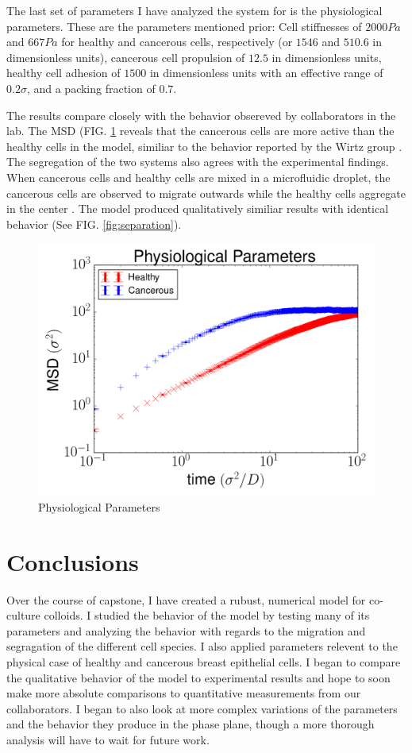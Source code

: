 \documentclass[aps,prb,twocolumn,groupedaddress,nofootinbib,floatfix]{revtex4}
\begin{document}
The last set of parameters I have analyzed the system for is the physiological parameters.
These are the parameters mentioned prior: Cell stiffnesses of $2000Pa$ and $667Pa$ for healthy and cancerous cells, respectively (or $1546$ and $510.6$ in dimensionless units), cancerous cell propulsion of $12.5$ in dimensionless units, healthy cell adhesion of $1500$ in dimensionless units with an effective range of $0.2\sigma$, and a packing fraction of $0.7$.

The results compare closely with the behavior obsereved by collaborators in the lab.
The MSD (FIG. \ref{fig:phys} reveals that the cancerous cells are more active than the healthy cells in the model, similiar to the behavior reported by the Wirtz group \cite{Lee}.
The segregation of the two systems also agrees with the experimental findings.
When cancerous cells and healthy cells are mixed in a microfluidic droplet, the cancerous cells are observed to migrate outwards while the healthy cells aggregate in the center \cite{Lu}.
The model produced qualitatively similiar results with identical behavior (See FIG. \ref{fig:separation}).


\begin{figure}
  \includegraphics[width=0.9\columnwidth]{images/physmsd.png}
  \caption{Physiological Parameters}
   \label{fig:phys}
\end{figure}


\section{Conclusions}
Over the course of capstone, I have created a rubust, numerical model for co-culture colloids.
I studied the behavior of the model by testing many of its parameters and analyzing the behavior with regards to the migration and segragation of the different cell species.
I also applied parameters relevent to the physical case of healthy and cancerous breast epithelial cells.
I began to compare the qualitative behavior of the model to experimental results and hope to soon make more absolute comparisons to quantitative measurements from our collaborators.
I began to also look at more complex variations of the parameters and the behavior they produce in the phase plane, though a more thorough analysis will have to wait for future work.
\end{document}
